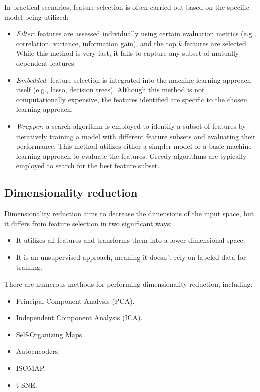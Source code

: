 In practical scenarios, feature selection is often carried out based on the specific model being utilized:
\begin{itemize}
    \item \textit{Filter}: features are assessed individually using certain evaluation metrics (e.g., correlation, variance, information gain), and the top $k$ features are selected. 
        While this method is very fast, it fails to capture any subset of mutually dependent features.
    \item \textit{Embedded}: feature selection is integrated into the machine learning approach itself (e.g., lasso, decision trees).
        Although this method is not computationally expensive, the features identified are specific to the chosen learning approach.
    \item \textit{Wrapper}: a search algorithm is employed to identify a subset of features by iteratively training a model with different feature subsets and evaluating their performance. 
        This method utilizes either a simpler model or a basic machine learning approach to evaluate the features. 
        Greedy algorithms are typically employed to search for the best feature subset.
\end{itemize}

\subsection{Dimensionality reduction}
Dimensionality reduction aims to decrease the dimensions of the input space, but it differs from feature selection in two significant ways:
\begin{itemize}
    \item It utilizes all features and transforms them into a lower-dimensional space.
    \item It is an unsupervised approach, meaning it doesn't rely on labeled data for training.
\end{itemize}
There are numerous methods for performing dimensionality reduction, including:
\begin{itemize}
    \item Principal Component Analysis (PCA).
    \item Independent Component Analysis (ICA).
    \item Self-Organizing Maps.
    \item Autoencoders.
    \item ISOMAP.\@
    \item t-SNE.\@
\end{itemize}